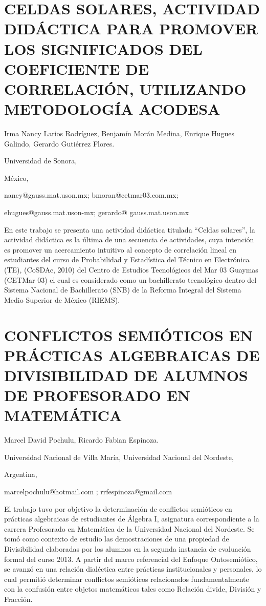 \section{CELDAS SOLARES, ACTIVIDAD DIDÁCTICA PARA PROMOVER LOS SIGNIFICADOS
DEL COEFICIENTE DE CORRELACIÓN, UTILIZANDO METODOLOGÍA ACODESA }

\begin{datos}

Irma Nancy Larios Rodríguez, Benjamín Morán Medina, Enrique Hugues
Galindo, Gerardo Gutiérrez Flores.

Universidad de Sonora,

México,

nancy@gauss.mat.uson.mx; bmoran@cetmar03.com.mx;

ehugues@gauss.mat.uson-mx; gerardo@ gauss.mat.uson.mx 

\end{datos}

En este trabajo se presenta una actividad didáctica titulada “Celdas
solares”, la actividad didáctica es la última de una secuencia de
actividades, cuya intención es promover un acercamiento intuitivo
al concepto de correlación lineal en estudiantes del curso de Probabilidad
y Estadística del Técnico en Electrónica (TE), (CoSDAc, 2010) del
Centro de Estudios Tecnológicos del Mar 03 Guaymas (CETMar 03) el
cual es considerado como un bachillerato tecnológico dentro del Sistema
Nacional de Bachillerato (SNB) de la Reforma Integral del Sistema
Medio Superior de México (RIEMS). 


\section{CONFLICTOS SEMIÓTICOS EN PRÁCTICAS ALGEBRAICAS DE DIVISIBILIDAD DE
ALUMNOS DE PROFESORADO EN MATEMÁTICA}

\begin{datos}

Marcel David Pochulu, Ricardo Fabian Espinoza.

Universidad Nacional de Villa María, Universidad Nacional del Nordeste,

Argentina,

marcelpochulu@hotmail.com ; rrfespinoza@gmail.com

\end{datos}

El trabajo tuvo por objetivo la determinación de conflictos semióticos
en prácticas algebraicas de estudiantes de Álgebra I, asignatura correspondiente
a la carrera Profesorado en Matemática de la Universidad Nacional
del Nordeste. Se tomó como contexto de estudio las demostraciones
de una propiedad de Divisibilidad elaboradas por los alumnos en la
segunda instancia de evaluación formal del curso 2013. A partir del
marco referencial del Enfoque Ontosemiótico, se avanzó en una relación
dialéctica entre prácticas institucionales y personales, lo cual permitió
determinar conflictos semióticos relacionados fundamentalmente con
la confusión entre objetos matemáticos tales como Relación divide,
División y Fracción.


